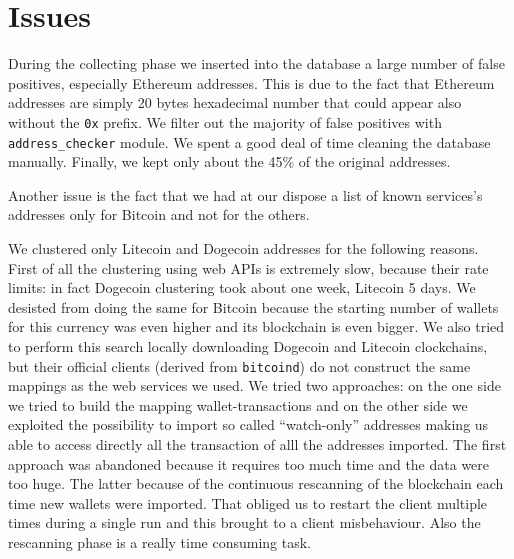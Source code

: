 \section{Issues} \label{sec:issues}
During the collecting phase we inserted into the database a large number of
false positives, especially Ethereum addresses. This is due to the fact that
Ethereum addresses are simply 20 bytes hexadecimal number that could appear
also without the \texttt{0x} prefix. We filter out the majority of false
positives with \texttt{address\_checker} module. We spent a good deal of time
cleaning the database manually. Finally, we kept only about the 45\% of the
original addresses. 

Another issue is the fact that we had at our dispose a list of known services's
addresses only for Bitcoin and not for the others.

We clustered only Litecoin and Dogecoin addresses for the following reasons.
First of all the clustering using web APIs is extremely slow, because their
rate limits: in fact Dogecoin clustering took about one week, Litecoin 5 days.
We desisted from doing the same for Bitcoin because the starting number of
wallets for this currency was even higher and its blockchain is even bigger. We
also tried to perform this search locally downloading Dogecoin and Litecoin
clockchains, but their official clients (derived from \texttt{bitcoind}) do not
construct the same mappings as the web services we used. We tried two
approaches: on the one side we tried to build the mapping wallet-transactions
and on the other side we exploited the possibility to import so called
``watch-only'' addresses making us able to access directly all the transaction
of alll the addresses imported. The first approach was abandoned because it
requires too much time and the data were too huge. The latter because of the
continuous rescanning of the blockchain each time new wallets were imported.
That obliged us to restart the client multiple times during a single run and
this brought to a client misbehaviour. Also the rescanning phase is a really
time consuming task.

